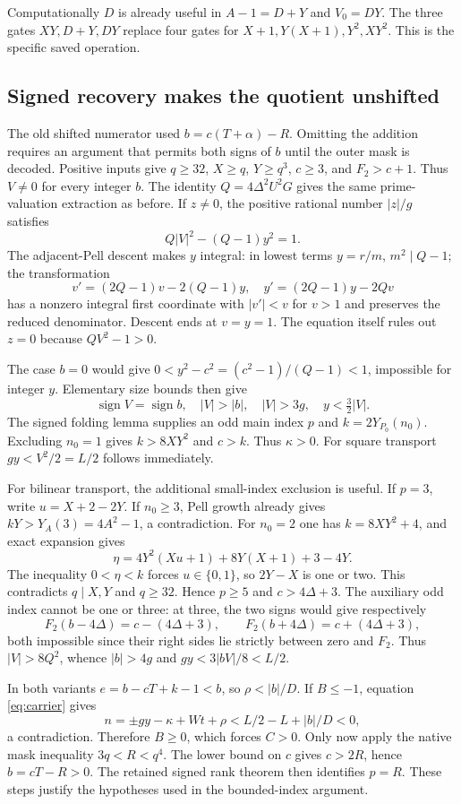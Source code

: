 \documentclass[11pt,letterpaper]{article}
\theoremstyle{remark}\newtheorem{remark}[theorem]{Remark}
\begin{document}
Computationally $D$ is already useful in $A-1=D+Y$ and $V_0=DY$.
The three gates $XY,D+Y,DY$ replace four gates for
$X+1,Y(X+1),Y^2,XY^2$. This is the specific saved operation.

\subsection{Signed recovery makes the quotient unshifted}

The old shifted numerator used $b=c(T+\alpha)-R$. Omitting the addition
requires an argument that permits both signs of $b$ until the outer mask
is decoded. Positive inputs give $q\ge32$, $X\ge q$, $Y\ge q^3$,
$c\ge3$, and $F_2>c+1$. Thus $V\ne0$ for every integer $b$.
The identity $Q=4\Delta^2U^2G$ gives the same prime-valuation extraction
as before. If $z\ne0$, the positive rational number $|z|/g$ satisfies
\[
Q|V|^2-(Q-1)y^2=1.
\]
The adjacent-Pell descent makes $y$ integral: in lowest terms $y=r/m$,
$m^2\mid Q-1$; the transformation
\[
v'=(2Q-1)v-2(Q-1)y,\quad y'=(2Q-1)y-2Qv
\]
has a nonzero integral first coordinate with $|v'|<v$ for $v>1$ and
preserves the reduced denominator. Descent ends at $v=y=1$.
The equation itself rules out $z=0$ because $QV^2-1>0$.

The case $b=0$ would give
$0<y^2-c^2=(c^2-1)/(Q-1)<1$, impossible for integer $y$.
Elementary size bounds then give
\[
\operatorname{sign}V=\operatorname{sign}b,\quad
|V|>|b|,\quad |V|>3g,\quad y<\tfrac32|V|.
\]
The signed folding lemma supplies an odd main index $p$ and
$k=2Y_{P_0}(n_0)$. Excluding $n_0=1$ gives
$k>8XY^2$ and $c>k$. Thus $\kappa>0$.
For square transport $gy<V^2/2=L/2$ follows immediately.

For bilinear transport, the additional small-index exclusion is useful.
If $p=3$, write $u=X+2-2Y$. If $n_0\ge3$, Pell growth already gives
$kY>Y_A(3)=4A^2-1$, a contradiction. For $n_0=2$ one has
$k=8XY^2+4$, and exact expansion gives
\[
\eta=4Y^2(Xu+1)+8Y(X+1)+3-4Y.
\]
The inequality $0<\eta<k$ forces $u\in\{0,1\}$, so $2Y-X$ is one or
two. This contradicts $q\mid X,Y$ and $q\ge32$.
Hence $p\ge5$ and $c>4\Delta+3$.
The auxiliary odd index cannot be one or three: at three, the two signs
would give respectively
\[
F_2(b-4\Delta)=c-(4\Delta+3),\qquad
F_2(b+4\Delta)=c+(4\Delta+3),
\]
both impossible since their right sides lie strictly between zero and $F_2$.
Thus $|V|>8Q^2$, whence $|b|>4g$ and
$gy<3|bV|/8<L/2$.

In both variants $e=b-cT+k-1<b$, so $\rho<|b|/D$.
If $B\le-1$, equation \eqref{eq:carrier} gives
\[
n=\pm gy-\kappa+Wt+\rho<L/2-L+|b|/D<0,
\]
a contradiction. Therefore $B\ge0$, which forces $C>0$.
Only now apply the native mask inequality $3q<R<q^4$.
The lower bound on $c$ gives $c>2R$, hence $b=cT-R>0$.
The retained signed rank theorem then identifies $p=R$.
These steps justify the hypotheses used in the bounded-index argument.
\end{document}
